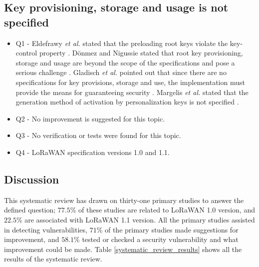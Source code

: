 \documentclass[manuscript,screen,review=false]{acmart}
\begin{document}
\subsection{Key provisioning, storage and usage is not specified}

\begin{itemize}
\item Q1 - Eldefrawy {\it et al.} stated that the preloading root keys violate the key-control property \cite{01_formal_security_analysis_LoRaWAN}. D\"onmez and Nigussie stated that root key provisioning, storage and usage are beyond the scope of the specifications and pose a serious challenge \cite{02_security_procedure_LoRaWANv1.1}. Gladisch {\it et al.} pointed out that since there are no specifications for key provisions, storage and use, the implementation must provide the means for guaranteeing security \cite{24_securely_IoT_lorawan}. Margelis {\it et al.} stated that the generation method of activation by personalization keys is not specified \cite{70_low_throughput_networks_IoT}.

\item Q2 - No improvement is suggested for this topic.

\item Q3 - No verification or tests were found for this topic.

\item Q4 - LoRaWAN specification versions 1.0 and 1.1.
\end{itemize}

\subsection{Discussion}

This systematic review has drawn on thirty-one primary studies to answer the defined question; $77.5$\% of these studies are related to LoRaWAN 1.0 version, and $22.5$\% are associated with LoRaWAN 1.1 version. All the primary studies assisted in detecting vulnerabilities, $71$\% of the primary studies made suggestions for improvement, and $58.1$\% tested or checked a security vulnerability and what improvement could be made. Table \ref{systematic_review_results} shows all the results of the systematic review.
\end{document}
